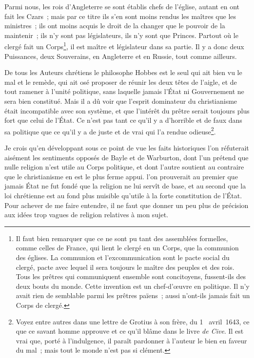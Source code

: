 \documentclass[french,twoside]{book} %
\begin{document}
Parmi nous, les rois d’Angleterre se sont établis chefs de l’église, autant en ont fait les Czars ; mais par ce titre ils s’en sont moins rendus les maîtres que les ministres ; ils ont moins acquis le droit de la changer que le pouvoir de la maintenir ; ils n’y sont pas législateurs, ils n’y sont que Princes. Partout où le clergé fait un Corps\footnote{Il faut bien remarquer que ce ne sont pu tant des assemblées formelles, comme celles de France, qui lient le clergé en un Corps, que la communion des églises. La communion et l’excommunication sont le pacte social du clergé, pacte avec lequel il sera toujours le maître des peuples et des rois. Tous les prêtres qui communiquent ensemble sont concitoyens, fussent-ils des deux bouts du monde. Cette invention est un chef-d’œuvre en politique. Il n’y avait rien de semblable parmi les prêtres païens ; aussi n’ont-ils jamais fait un Corps de clergé.}, il est maître et législateur dans sa partie. Il y a donc deux Puissances, deux Souverains, en Angleterre et en Russie, tout comme ailleurs.\par
De tous les Auteurs chrétiens le philosophe Hobbes est le seul qui ait bien vu le mal et le remède, qui ait osé proposer de réunir les deux têtes de l’aigle, et de tout ramener à l’unité politique, sans laquelle jamais l’État ni Gouvernement ne sera bien constitué. Mais il a dû voir que l’esprit dominateur du christianisme était incompatible avec son système, et que l’intérêt du prêtre serait toujours plus fort que celui de l’État. Ce n’est pas tant ce qu’il y a d’horrible et de faux dans sa politique que ce qu’il y a de juste et de vrai qui l’a rendue odieuse\footnote{Voyez entre autres dans une lettre de Grotius à son frère, du 1  avril 1643, ce que ce savant homme approuve et ce qu’il blâme dans le livre {\itshape de Cive}. Il est vrai que, porté à l’indulgence, il paraît pardonner à l’auteur le bien en faveur du mal ; mais tout le monde n’est pas si clément.}.\par
Je crois qu’en développant sous ce point de vue les faits historiques l’on réfuterait aisément les sentiments opposés de Bayle et de Warburton, dont l’un prétend que nulle religion n’est utile au Corps politique, et dont l’autre soutient au contraire que le christianisme en est le plus ferme appui. l’on prouverait au premier que jamais État ne fut fondé que la religion ne lui servît de base, et au second que la loi chrétienne est au fond plus nuisible qu’utile à la forte constitution de l’État. Pour achever de me faire entendre, il ne faut que donner un peu plus de précision aux idées trop vagues de religion relatives à mon sujet.\par
\end{document}
